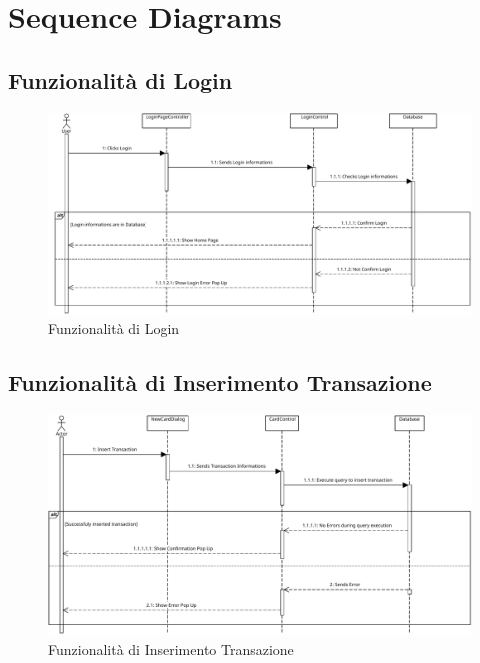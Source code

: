 \chapter{Sequence Diagrams}

\section{Funzionalità di Login}

\begin{figure}[!h]
    \centering
    \includegraphics[scale=0.5]{pdfs/Login Sequence.pdf}
    \caption{Funzionalità di Login}\label{Funzionalità di Login}
\end{figure}

\section{Funzionalità di Inserimento Transazione}

\begin{figure}[!h]
    \centering
    \includegraphics[scale=0.5]{pdfs/New Transaction Sequence.pdf}
    \caption{Funzionalità di Inserimento Transazione}\label{Funzionalità di Inserimento Transazione}
\end{figure}